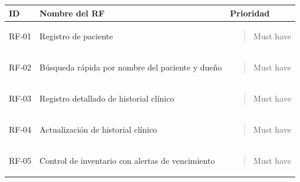 \documentclass[
]{article}
\newcounter{none} %
\begin{document}
{\def\LTcaptype{none} %
\begin{longtable}[]{@{}
  >{\raggedleft\arraybackslash}p{}
  >{\raggedright\arraybackslash}p{}
  >{\raggedright\arraybackslash}p{}@{}}
\toprule\noalign{}
\begin{minipage}[b]{\linewidth}\raggedleft
\textbf{ID}
\end{minipage} & \begin{minipage}[b]{\linewidth}\centering
\textbf{Nombre del RF}
\end{minipage} & \begin{minipage}[b]{\linewidth}\centering
\textbf{Prioridad}
\end{minipage} \\
\midrule\noalign{}
\endhead
\bottomrule\noalign{}
\endlastfoot
RF-01 & Registro de paciente &
\begin{minipage}[t]{\linewidth}\raggedright
\begin{quote}
Must have
\end{quote}
\end{minipage} \\
RF-02 & Búsqueda rápida por nombre del paciente y dueño &
\begin{minipage}[t]{\linewidth}\raggedright
\begin{quote}
Must have
\end{quote}
\end{minipage} \\
RF-03 & Registro detallado de historial clínico &
\begin{minipage}[t]{\linewidth}\raggedright
\begin{quote}
Must have
\end{quote}
\end{minipage} \\
RF-04 & Actualización de historial clínico &
\begin{minipage}[t]{\linewidth}\raggedright
\begin{quote}
Must have
\end{quote}
\end{minipage} \\
RF-05 & Control de inventario con alertas de vencimiento &
\begin{minipage}[t]{\linewidth}\raggedright
\begin{quote}
Must have
\end{quote}
\end{minipage} \\

\end{longtable}}
\end{document}
